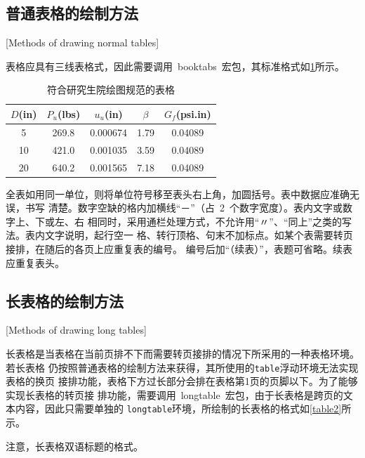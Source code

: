 \subsection{普通表格的绘制方法}[Methods of drawing normal tables]

表格应具有三线表格式，因此需要调用~booktabs~宏包，其标准格式如\cref{table1}所示。
\begin{table}[htbp]
\caption{符合研究生院绘图规范的表格}
\label{table1}
\vspace{0.5em}\centering\wuhao
\begin{tabular}{ccccc}
\toprule
$D$(in) & $P_u$(lbs) & $u_u$(in) & $\beta$ & $G_f$(psi.in)\\
\midrule
 5 & 269.8 & 0.000674 & 1.79 & 0.04089\\
10 & 421.0 & 0.001035 & 3.59 & 0.04089\\
20 & 640.2 & 0.001565 & 7.18 & 0.04089\\
\bottomrule
\end{tabular}
\end{table}
全表如用同一单位，则将单位符号移至表头右上角，加圆括号。表中数据应准确无误，书写
清楚。数字空缺的格内加横线“－”（占~2~个数字宽度）。表内文字或数字上、下或左、右
相同时，采用通栏处理方式，不允许用“〃”、“同上”之类的写法。表内文字说明，起行空一
格、转行顶格、句末不加标点。如某个表需要转页接排，在随后的各页上应重复表的编号。
编号后加“（续表）”，表题可省略。续表应重复表头。

\subsection{长表格的绘制方法}[Methods of drawing long tables]

长表格是当表格在当前页排不下而需要转页接排的情况下所采用的一种表格环境。若长表格
仍按照普通表格的绘制方法来获得，其所使用的\verb|table|浮动环境无法实现表格的换页
接排功能，表格下方过长部分会排在表格第1页的页脚以下。为了能够实现长表格的转页接
排功能，需要调用~longtable~宏包，由于长表格是跨页的文本内容，因此只需要单独的
\verb|longtable|环境，所绘制的长表格的格式如\cref{table2}所示。

注意，长表格双语标题的格式。

